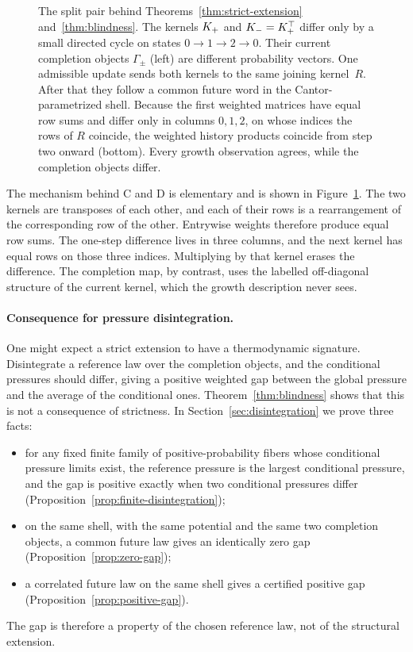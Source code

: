 \begin{figure}[t]
\centering

\caption{The split pair behind Theorems~\ref{thm:strict-extension} and~\ref{thm:blindness}. The kernels $K_{+}$ and $K_{-}=K_{+}^{\top}$ differ only by a small directed cycle on states $0\to1\to2\to0$. Their current completion objects $\Gamma_\pm$ (left) are different probability vectors. One admissible update sends both kernels to the same joining kernel~$R$. After that they follow a common future word in the Cantor-parametrized shell. Because the first weighted matrices have equal row sums and differ only in columns $0,1,2$, on whose indices the rows of $R$ coincide, the weighted history products coincide from step two onward (bottom). Every growth observation agrees, while the completion objects differ.}
\label{fig:split-merge}
\end{figure}

The mechanism behind C and D is elementary and is shown in Figure~\ref{fig:split-merge}. The two kernels are transposes of each other, and each of their rows is a rearrangement of the corresponding row of the other. Entrywise weights therefore produce equal row sums. The one-step difference lives in three columns, and the next kernel has equal rows on those three indices. Multiplying by that kernel erases the difference. The completion map, by contrast, uses the labelled off-diagonal structure of the current kernel, which the growth description never sees.

\paragraph{Consequence for pressure disintegration.}
One might expect a strict extension to have a thermodynamic signature. Disintegrate a reference law over the completion objects, and the conditional pressures should differ, giving a positive weighted gap between the global pressure and the average of the conditional ones. Theorem~\ref{thm:blindness} shows that this is not a consequence of strictness. In Section~\ref{sec:disintegration} we prove three facts:
\begin{itemize}
  \item for any fixed finite family of positive-probability fibers whose conditional pressure limits exist, the reference pressure is the largest conditional pressure, and the gap is positive exactly when two conditional pressures differ (Proposition~\ref{prop:finite-disintegration});
  \item on the same shell, with the same potential and the same two completion objects, a common future law gives an identically zero gap (Proposition~\ref{prop:zero-gap});
  \item a correlated future law on the same shell gives a certified positive gap (Proposition~\ref{prop:positive-gap}).
\end{itemize}
The gap is therefore a property of the chosen reference law, not of the structural extension.


